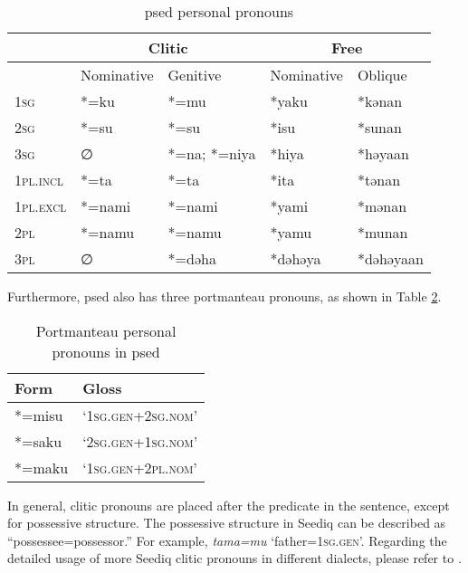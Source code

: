\begin{table}[!htbp]
\centering
\caption{\acl{psed} personal pronouns}
\label{tab:psedpron}
\begin{tabular}{lllll}
\hline
         & \multicolumn{2}{c}{Clitic} & \multicolumn{2}{c}{Free} \\ \hline
         & Nominative    & Genitive   & Nominative & Oblique     \\ \hline
\textsc{1sg}      & *=ku          & *=mu       & *yaku      & *kənan      \\
\textsc{2sg}      & *=su          & *=su       & *isu       & *sunan      \\
\textsc{3sg}      & ∅             & *=na; *=niya & *hiya      & *həyaan     \\
\textsc{1pl.incl} & *=ta          & *=ta       & *ita       & *tənan      \\
\textsc{1pl.excl} & *=nami        & *=nami     & *yami      & *mənan      \\
\textsc{2pl}      & *=namu        & *=namu     & *yamu      & *munan      \\
\textsc{3pl}      & ∅             & *=dəha     & *dəhəya    & *dəhəyaan   \\ \hline
\end{tabular}
\end{table}

Furthermore, \acl{psed} also has three portmanteau pronouns, as shown in Table \ref{tab:por}.

\begin{table}[!htbp]
\centering
\caption{Portmanteau personal pronouns in \acl{psed}}
\label{tab:por}
\begin{tabular}{ll}
\hline
Form   & Gloss \\ 
\hline
*=misu & `\textsc{1sg.gen+2sg.nom}' \\
*=saku & `\textsc{2sg.gen+1sg.nom}' \\
*=maku & `\textsc{1sg.gen+2pl.nom}' \\
\hline
\end{tabular}
\end{table}

In general, clitic pronouns are placed after the predicate in the sentence, except for possessive structure. The possessive structure in Seediq can be described as ``possessee=possessor.'' For example, \textit{tama=mu} `father=\textsc{1sg.gen}'. Regarding the detailed usage of more Seediq clitic pronouns in different dialects, please refer to \textcite{ochiai2009sedpron,kuondtrvpronoun,holmer2014clitic}.

